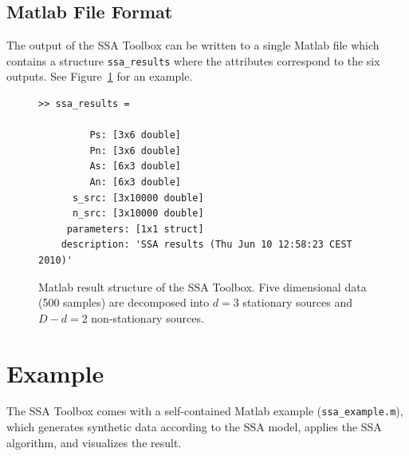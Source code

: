 \documentclass{article}
\newcommand{\1}{\ensuremath{\mathds{1}}}
\newcommand{\0}{\ensuremath{0}}
\begin{document}
\subsection{Matlab File Format}

The output of the SSA Toolbox can be written to a single Matlab file which contains
a structure \texttt{ssa\_results} where the attributes correspond to the six outputs. 
See Figure~\ref{fig:ex_matlab_res} for an example.

\begin{figure}[h]
\centering
\begin{boxedminipage}{12cm}
\begin{verbatim}
>> ssa_results = 

         Ps: [3x6 double]
         Pn: [3x6 double]
         As: [6x3 double]
         An: [6x3 double]
      s_src: [3x10000 double]
      n_src: [3x10000 double]
     parameters: [1x1 struct]
    description: 'SSA results (Thu Jun 10 12:58:23 CEST 2010)'
\end{verbatim}
\end{boxedminipage}
\caption{
Matlab result structure of the SSA Toolbox. Five dimensional data (500 samples) 
are decomposed into $d = 3$ stationary sources and $D-d = 2$ non-stationary sources.
\label{fig:ex_matlab_res}
}
\end{figure}

\FloatBarrier %

\section{Example}

The SSA Toolbox comes with a self-contained Matlab example (\texttt{ssa\_example.m}), which 
generates synthetic data according to the SSA model, applies the SSA algorithm, and visualizes the result.
\end{document}
